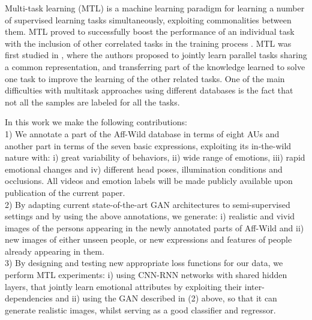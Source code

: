 \documentclass[a4paper, 10pt, conference]{ieeeconf}      %
\begin{document}
Multi-task learning (MTL) \cite{caruana1997multitask} is a machine learning paradigm for learning a number of supervised learning tasks simultaneously, exploiting commonalities between them. MTL proved to successfully boost the performance of an individual task with the inclusion of other correlated tasks in the training process \cite{ganin2014unsupervised}\cite{hinton2015distilling}.
MTL was first studied in \cite{caruana1997multitask}, where the authors proposed to jointly learn parallel tasks sharing a common representation, and transferring part of the knowledge learned to solve one task to improve the learning of the other related tasks. 
One of the main difficulties with multitask approaches using different databases is the fact that not all the samples are labeled for all the tasks.

In this work we make the following contributions: \\ %
1) We annotate a part of the Aff-Wild database in terms of eight AUs and another part in terms of the seven basic expressions, exploiting its in-the-wild nature with:  i) great variability of behaviors, ii) wide range of emotions, iii) rapid emotional changes and iv) different head poses, illumination conditions and occlusions. All videos and emotion labels will be made publicly available upon publication of the current paper.\\
2) By adapting current state-of-the-art GAN architectures to semi-supervised settings and by using the above annotations, we generate: i) realistic and vivid images of the persons appearing in the newly annotated parts of Aff-Wild and ii) new images of either unseen people, or new expressions and features of people already appearing in them.\\
3) By designing and testing new appropriate loss functions for our data, we perform MTL experiments: i) using CNN-RNN networks with shared hidden
layers, that jointly learn emotional attributes by exploiting their inter-dependencies and ii) using the GAN described in (2) above, so that it can generate realistic images, whilst serving as a good classifier and regressor.
\end{document}
